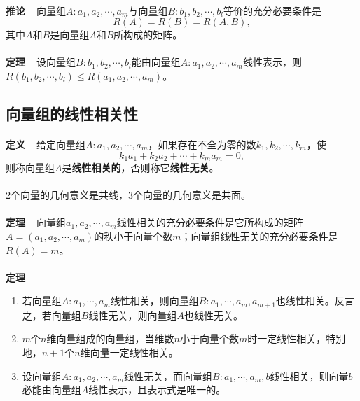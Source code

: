 \paragraph{}
\textbf{推论~~}向量组$A:a_1,a_2,\cdots,a_m$与向量组$B:b_1,b_2,\cdots,b_l$等价的充分必要条件是
\begin{equation*}
  R(A)=R(B)=R(A,B),
\end{equation*}
其中$A$和$B$是向量组$A$和$B$所构成的矩阵。

\paragraph{}
\textbf{定理~~}设向量组$B: b_1,b_2,\cdots,b_l$能由向量组$A:a_1,a_2,\cdots,a_m$线性表示，则\\$R(b_1,b_2,\cdots,b_l)\leq R(a_1,a_2,\cdots,a_m)$。

\subsection{向量组的线性相关性}
\paragraph{}
\textbf{定义~~}给定向量组$A:a_1,a_2,\cdots,a_m$，如果存在不全为零的数$k_1,k_2,\cdots,k_m$，使
\begin{equation*}
  k_1a_1 + k_2a_2 + \cdots + k_ma_m = 0,
\end{equation*}
则称向量组$A$是\textbf{线性相关的}，否则称它\textbf{线性无关}。

\paragraph{}
2个向量的几何意义是共线，3个向量的几何意义是共面。

\paragraph{}
\textbf{定理~~}向量组$a_1,a_2,\cdots,a_m$线性相关的充分必要条件是它所构成的矩阵\\$A=(a_1,a_2,\cdots,a_m)$的秩小于向量个数$m$；向量组线性无关的充分必要条件是$R(A)=m$。

\paragraph{}
\textbf{定理~~}
\begin{enumerate}
  \item 若向量组$A: a_1,\cdots,a_m$线性相关，则向量组$B: a_1, \cdots,a_m,a_{m+1}$也线性相关。反言之，若向量组$B$线性无关，则向量组$A$也线性无关。
  \item $m$个$n$维向量组成的向量组，当维数$n$小于向量个数$m$时一定线性相关，特别地，$n+1$个$n$维向量一定线性相关。
  \item 设向量组$A: a_1,a_2,\cdots,a_m$线性无关，而向量组$B: a_1,\cdots,a_m,b$线性相关，则向量$b$必能由向量组$A$线性表示，且表示式是唯一的。
\end{enumerate}


